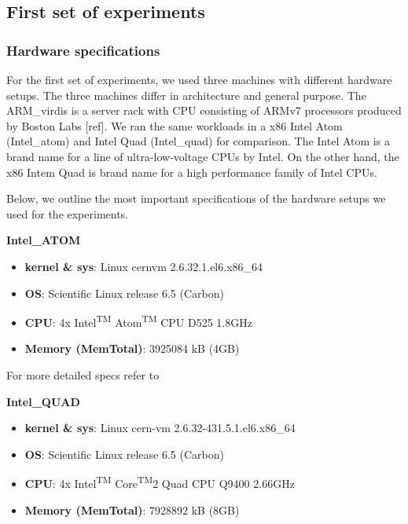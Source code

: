 \subsection{First set of experiments}

\subsubsection*{Hardware specifications}
For the first set of experiments, we used three machines with different hardware setups. The three machines differ in architecture and general purpose. The ARM\_virdis is a server rack with CPU consisting of ARMv7 processors produced by Boston Labs [ref]. We ran the same workloads in a x86 Intel Atom (Intel\_atom) and Intel Quad (Intel\_quad) for comparison. The Intel Atom is a brand name for a line of ultra-low-voltage CPUs by Intel. On the other hand, the x86 Intem Quad is brand name for a high performance family of Intel CPUs.

Below, we outline the most important specifications of the hardware setups we used for the experiments.

\vspace{10mm}
\textbf{Intel\_ATOM}
\begin{itemize}
  \item[] \textbf{kernel \& sys}:  Linux cern\-vm 2.6.32.1.el6.x86\_64
  \item[] \textbf{OS}: Scientific Linux release 6.5 (Carbon)
  \item[] \textbf{CPU}:   4x Intel\textsuperscript{TM} Atom\textsuperscript{TM} CPU D525 \@ 1.8GHz
  \item[] \textbf{Memory  (MemTotal)}:        3925084  kB (4GB)
\end{itemize}

For more detailed specs refer to \cite{atom_specs}

\vspace{10mm}
\textbf{Intel\_QUAD}
\begin{itemize}
  \item[] \textbf{kernel \& sys}:  Linux cern-vm 2.6.32-431.5.1.el6.x86\_64
  \item[] \textbf{OS}: Scientific Linux release 6.5 (Carbon)
  \item[] \textbf{CPU}:    4x Intel\textsuperscript{TM} Core\textsuperscript{TM}2 Quad CPU  Q9400  \@ 2.66GHz
  \item[] \textbf{Memory  (MemTotal)}:        7928892 kB (8GB)
\end{itemize}

